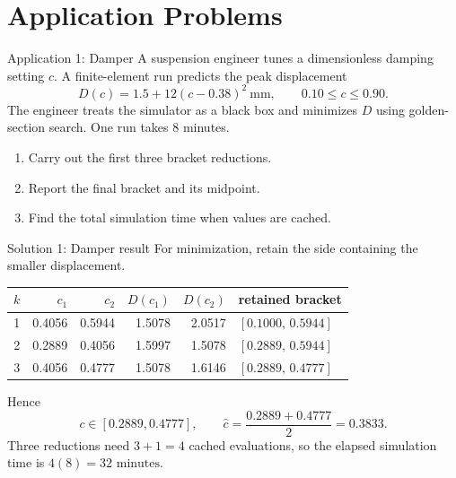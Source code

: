 \documentclass[aspectratio=169,11pt,t]{beamer}
\begin{document}
\section{Application Problems}

\begin{frame}{Application 1: Damper}
  A suspension engineer tunes a dimensionless damping setting \(c\). A
  finite-element run predicts the peak displacement
  \[
    D(c)=1.5+12(c-0.38)^2\ \text{mm},
    \qquad 0.10\le c\le0.90.
  \]
  The engineer treats the simulator as a black box and minimizes \(D\) using
  golden-section search. One run takes \(8\) minutes.

  \begin{enumerate}
    \item Carry out the first three bracket reductions.
    \item Report the final bracket and its midpoint.
    \item Find the total simulation time when values are cached.
  \end{enumerate}

\end{frame}

\begin{frame}{Solution 1: Damper result}
  For minimization, retain the side containing the smaller displacement.

  \vspace{0.08cm}
  {\centering
  \fontsize{12.5}{15}\selectfont
  \setlength{\tabcolsep}{4.0pt}
  \begin{tabular}{c r r r r l}
    \toprule
    \(k\) & \(c_1\) & \(c_2\) & \(D(c_1)\) & \(D(c_2)\) & retained bracket \\
    \midrule
    1 & 0.4056 & 0.5944 & 1.5078 & 2.0517 & \([0.1000,\,0.5944]\) \\
    2 & 0.2889 & 0.4056 & 1.5997 & 1.5078 & \([0.2889,\,0.5944]\) \\
    3 & 0.4056 & 0.4777 & 1.5078 & 1.6146 & \([0.2889,\,0.4777]\) \\
    \bottomrule
  \end{tabular}\par}

  \vspace{0.16cm}
  Hence
  \[
    c\in[0.2889,0.4777],
    \qquad \widehat c=\frac{0.2889+0.4777}{2}=\boxed{0.3833}.
  \]
  Three reductions need \(3+1=4\) cached evaluations, so the elapsed simulation
  time is \(4(8)=\boxed{32\text{ minutes}}\).

\end{frame}
\end{document}
